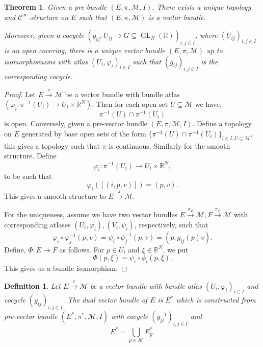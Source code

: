 \documentclass[10pt]{article}
\newtheorem{theorem}{Theorem} [section]
\newtheorem{definition}{Definition}[section]
\DeclareMathOperator{\GL}{GL}
\newcommand{\R}[0]{\mathbb{R}}
\newcommand{\M}[0]{\mathcal{M}}
\newcommand{\cinf}[0]{\mathcal{C}^\infty}
\begin{document}
\begin{theorem}
  Given a pre-bundle $(E,\pi,\M,I)$. There exists a unique topology and $\cinf$-structure on $E$ such that $(E,\pi,\M)$ is a vector bundle.
  \par Moreover, given a cocycle $(g_{ij}:U_{ij}\to G\subseteq\GL_N(\R))_{i,j\in I}$, where $(U_{ij})_{i,j\in I}$ is an open covering, there is a unique vector bundle $(E,\pi,\M)$ up to isomorphismsms with atlas $(U_i,\varphi_i)_{i\in I}$ such that $(g_{ij})_{i,j\in I}$ is the corresponding cocycle.
\end{theorem}

\begin{proof}
  Let $E\stackrel{\pi}{\to}\M$ be a vector bundle with bundle atlas $(\varphi_i:\pi^{-1}(U_i)\to U_i\times \R^N)$. Then for each open set $U\subseteq\M$ we have,
  \begin{equation*}
    \pi^{-1}(U)\cap\pi^{-1}(U_i)
  \end{equation*}
  is open. Conversely, given a pre-vector bundle $(E,\pi,\M,I)$. Define a topology on $E$ generated by base open sets of the form $\{\pi^{-1}(U)\cap\pi^{-1}(U_i)\}_{i\in I,U\subseteq\M}$, this gives a topology such that $\pi$ is continuous. Similarly for the smooth structure. Define 
  \begin{equation*}
    \varphi_i:\pi^{-1}(U_i)\to U_i\times \R^N,
  \end{equation*}
  to be such that 
  \begin{equation*}
    \varphi_i([(i,p,v)]) = (p,v).
  \end{equation*}
  This gives a smooth structure to $E\stackrel{\pi}{\to}\M$.
  \par For the uniqueness, assume we have two vector bundles $E\stackrel{\pi_E}{\to}\M,F\stackrel{\pi_F}{\to}\M$ with corresponding atlases $(U_i,\varphi_i),(V_i,\psi_i)$, respectively, such that 
  \begin{equation*}
    \varphi_i\circ\varphi_j^{-1}(p,v) = \psi_i\circ\psi_{j}^{-1}(p,v) = (p,g_{ij}(p)v).
  \end{equation*}
  Define, $\Phi:E\to F$ as follows. For $p\in U_i$ and $\xi\in\R^N$, we put
  \begin{equation*}
    \Phi(p,\xi) = \psi_i\circ\phi_i(p,\xi).
  \end{equation*}
  This gives us a bundle isomorphism.
\end{proof}

\begin{definition}
  Let $E\stackrel{\pi}{\to}\M$ be a vector bundle with bundle atlas $(U_i,\varphi_i)_{i\in I}$ and cocycle $(g_{ij})_{i,j\in I}$. The dual vector bundle of $E$ is $E^*$ which is constructed from pre-vector bundle $(E^*,\pi^*,\M,I)$ with cocycle $(g_{ji}^{-1})_{i,j\in I}$ and  
  \begin{equation*}
    E^* = \bigcup_{p\in \M}E_p^*.
  \end{equation*}
\end{definition}
\end{document}
